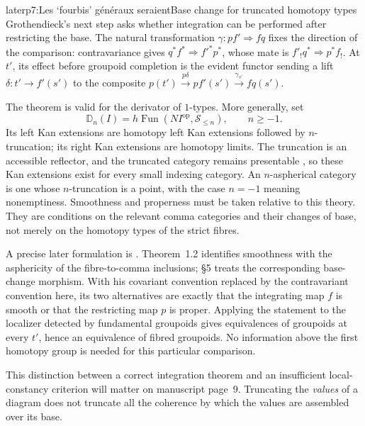 \begin{dcomment}{later}{p7:Les ‘fourbis’ généraux seraient}{Base change for truncated homotopy types}
Grothendieck's next step asks whether integration can be performed after restricting the base. The natural transformation $\gamma:pf'\Rightarrow fq$ fixes the direction of the comparison: contravariance gives $q^*f^*\Rightarrow f'^*p^*$, whose mate is $f'_!q^*\Rightarrow p^*f_!$. At $t'$, its effect before groupoid completion is the evident functor sending a lift $\delta:t'\to f'(s')$ to the composite $p(t')\xrightarrow{p\delta}pf'(s')\xrightarrow{\gamma_{s'}}fq(s')$.

The theorem is valid for the derivator of $1$-types. More generally, set
\[
 \mathbb D_n(I)=h\operatorname{Fun}(NI^{\mathrm{op}},\mathcal S_{\leq n}),
 \qquad n\geq-1.
\]
Its left Kan extensions are homotopy left Kan extensions followed by $n$-truncation; its right Kan extensions are homotopy limits. The truncation is an accessible reflector, and the truncated category remains presentable \citep[Proposition~5.5.6.18 and Remark~5.5.6.21]{Lurie2009HTT}, so these Kan extensions exist for every small indexing category. An $n$-aspherical category is one whose $n$-truncation is a point, with the case $n=-1$ meaning nonemptiness. Smoothness and properness must be taken relative to this theory. They are conditions on the relevant comma categories and their changes of base, not merely on the homotopy types of the strict fibres.

A precise later formulation is \citet[Theorem~1.2, Corollary~4.16, Example~4.17, and \S5]{Maltsiniotis2005Asphericite}. Theorem~1.2 identifies smoothness with the asphericity of the fibre-to-comma inclusions; \S5 treats the corresponding base-change morphism. With his covariant convention replaced by the contravariant convention here, its two alternatives are exactly that the integrating map $f$ is smooth or that the restricting map $p$ is proper. Applying the statement to the localizer detected by fundamental groupoids gives equivalences of groupoids at every $t'$, hence an equivalence of fibred groupoids. No information above the first homotopy group is needed for this particular comparison.

This distinction between a correct integration theorem and an insufficient local-constancy criterion will matter on manuscript page~9. Truncating the \emph{values} of a diagram does not truncate all the coherence by which the values are assembled over its base.
\end{dcomment}

